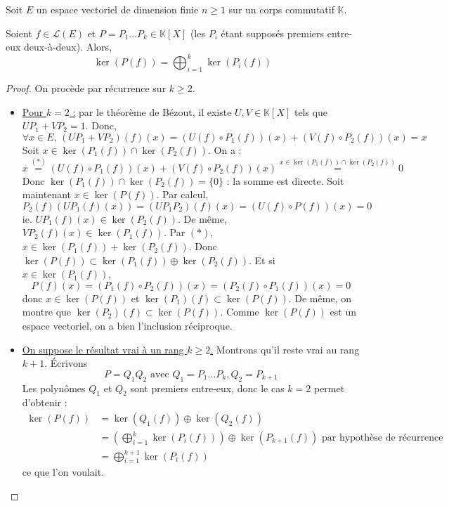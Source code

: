 





	Soit $E$ un espace vectoriel de dimension finie $n \geq 1$ sur un corps commutatif $\mathbb{K}$.

	\begin{lemma}
		\label{lemme-des-noyaux-1}
		Soient $f \in \mathcal{L}(E)$ et $P = P_1 \dots P_k \in \mathbb{K}[X]$ (les $P_i$ étant supposés premiers entre-eux deux-à-deux). Alors,
		\[ \ker(P(f)) = \bigoplus_{i = 1}^k \ker(P_i(f)) \]
	\end{lemma}

	\begin{proof}
		On procède par récurrence sur $k \geq 2$.
		\begin{itemize}
			\item \uline{Pour $k = 2$ :} par le théorème de Bézout, il existe $U, V \in \mathbb{K}[X]$ tels que $UP_1 + VP_2 = 1$. Donc,
			\[ \forall x \in E, \, (UP_1 + VP_2)(f)(x) = (U(f) \circ P_1(f))(x) + (V(f) \circ P_2(f))(x) = x \tag{$*$} \]
			Soit $x \in \ker(P_1(f)) \cap \ker(P_2(f))$. On a :
			\[ x \overset{(*)}{=} (U(f) \circ P_1(f))(x) + (V(f) \circ P_2(f))(x) \overset{x \in \ker(P_1(f)) \cap \ker(P_2(f))}{=} 0 \]
			Donc $\ker(P_1(f)) \cap \ker(P_2(f)) = \{ 0 \}$ : la somme est directe.
			\newpar
			Soit maintenant $x \in \ker(P(f))$. Par calcul,
			\[ P_2(f)(UP_1(f)(x)) = (UP_1P_2)(f)(x) = (U(f) \circ P(f))(x) = 0 \]
			ie. $UP_1(f)(x) \in \ker(P_2(f))$. De même, $VP_2(f)(x) \in \ker(P_1(f))$. Par $(*)$, $x \in \ker(P_1(f)) + \ker(P_2(f))$. Donc $\ker(P(f)) \subset \ker(P_1(f)) \oplus \ker(P_2(f))$.
			\newpar
			Et si $x \in \ker(P_1(f))$,
			\[ P(f)(x) = (P_1(f) \circ P_2(f))(x) = (P_2(f) \circ P_1(f))(x) = 0 \]
			donc $x \in \ker(P(f))$ et $\ker(P_1)(f) \subset \ker(P(f))$. De même, on montre que $\ker(P_2)(f) \subset \ker(P(f))$. Comme $\ker(P(f))$ est un espace vectoriel, on a bien l'inclusion réciproque.
			\item \uline{On suppose le résultat vrai à un rang $k \geq 2$.} Montrons qu'il reste vrai au rang $k+1$. Écrivons
			\[ P = Q_1Q_2 \text{ avec } Q_1 = P_1 \dots P_k, Q_2 = P_{k+1} \]
			Les polynômes $Q_1$ et $Q_2$ sont premiers entre-eux, donc le cas $k = 2$ permet d'obtenir :
			\begin{align*}
				\ker(P(f)) &= \ker(Q_1(f)) \oplus \ker(Q_2(f)) \\
				&= \left( \bigoplus_{i = 1}^k \ker(P_i(f)) \right) \oplus \ker(P_{k+1}(f)) \text{ par hypothèse de récurrence} \\
				&= \bigoplus_{i = 1}^{k+1} \ker(P_i(f))
			\end{align*}
			ce que l'on voulait.
		\end{itemize}
	\end{proof}

